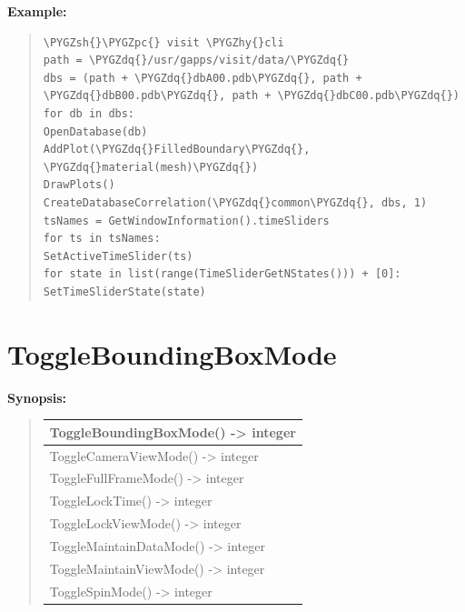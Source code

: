 \documentclass[letterpaper,10pt,english]{sphinxmanual}
\def\PYGZsh{\char`\#}
\def\PYGZpc{\char`\%}
\def\PYGZhy{\char`\-}
\def\PYGZdq{\char`\"}
\begin{document}
\begin{DUlineblock}{0em}
\item[] 
\end{DUlineblock}

\begin{DUlineblock}{0em}
\item[] \textbf{Example:}
\item[] 
\end{DUlineblock}
\begin{quote}

\begin{Verbatim}[commandchars=\\\{\}]
\PYGZsh{}\PYGZpc{} visit \PYGZhy{}cli
path = \PYGZdq{}/usr/gapps/visit/data/\PYGZdq{}
dbs = (path + \PYGZdq{}dbA00.pdb\PYGZdq{}, path + \PYGZdq{}dbB00.pdb\PYGZdq{}, path + \PYGZdq{}dbC00.pdb\PYGZdq{})
for db in dbs:
OpenDatabase(db)
AddPlot(\PYGZdq{}FilledBoundary\PYGZdq{}, \PYGZdq{}material(mesh)\PYGZdq{})
DrawPlots()
CreateDatabaseCorrelation(\PYGZdq{}common\PYGZdq{}, dbs, 1)
tsNames = GetWindowInformation().timeSliders
for ts in tsNames:
SetActiveTimeSlider(ts)
for state in list(range(TimeSliderGetNStates())) + [0]:
SetTimeSliderState(state)
\end{Verbatim}
\end{quote}


\section{ToggleBoundingBoxMode}
\label{functions:toggleboundingboxmode}
\begin{DUlineblock}{0em}
\item[] \textbf{Synopsis:}
\end{DUlineblock}
\begin{quote}

\begin{tabulary}{\linewidth}{|L|}
\hline

ToggleBoundingBoxMode() -\textgreater{} integer
\\
\hline
ToggleCameraViewMode() -\textgreater{} integer
\\
\hline
ToggleFullFrameMode() -\textgreater{} integer
\\
\hline
ToggleLockTime() -\textgreater{} integer
\\
\hline
ToggleLockViewMode() -\textgreater{} integer
\\
\hline
ToggleMaintainDataMode() -\textgreater{} integer
\\
\hline
ToggleMaintainViewMode() -\textgreater{} integer
\\
\hline
ToggleSpinMode() -\textgreater{} integer
\\
\hline\end{tabulary}

\end{quote}
\end{document}
